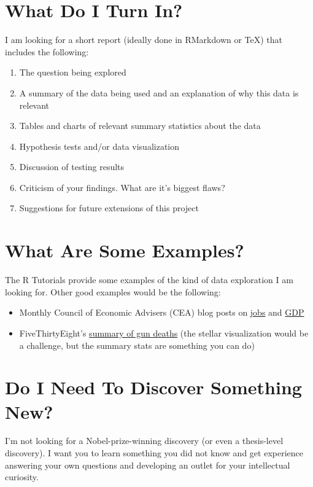 \documentclass[10pt,letterpaper]{article}
\begin{document}
\section{What Do I Turn In?}
I am looking for a short report (ideally done in RMarkdown or \TeX) that includes the following:
\begin{enumerate}
	\item The question being explored
	\item A summary of the data being used and an explanation of why this data is relevant
	\item Tables and charts of relevant summary statistics about the data
	\item Hypothesis tests and/or data visualization
	\item Discussion of testing results
	\item Criticism of your findings. What are it's biggest flaws?
	\item Suggestions for future extensions of this project
\end{enumerate}

\section{What Are Some Examples?}
The R Tutorials provide some examples of the kind of data exploration I am looking for. Other good examples would be the following:
\begin{itemize}
	\item Monthly Council of Economic Advisers (CEA) blog posts on \href{https://www.whitehouse.gov/blog/2016/09/02/employment-situation-august}{jobs} and \href{https://www.whitehouse.gov/blog/2016/08/26/second-estimate-gross-domestic-product-second-quarter-2016}{GDP} 
	\item FiveThirtyEight's \href{http://fivethirtyeight.com/features/gun-deaths/}{summary of gun deaths} (the stellar visualization would be a challenge, but the summary stats are something you can do) 
\end{itemize}

\section{Do I Need To Discover Something New?}
I'm not looking for a Nobel-prize-winning discovery (or even a thesis-level discovery). I want you to learn something you did not know and get experience answering your own questions and developing an outlet for your intellectual curiosity. 
\end{document}
